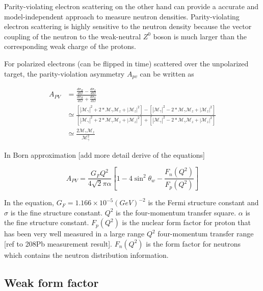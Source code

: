 Parity-violating electron scattering on the other hand can provide a accurate and model-independent approach to measure neutron densities. Parity-violating electron scattering is highly sensitive to the neutron density because the vector coupling of the neutron to the weak-neutral $Z^0$ boson is much larger than the corresponding weak charge of the protons. 

For polarized electrons (can be flipped in time) scattered over the unpolarized target, the parity-violation asymmetry $A_{pv}$ can be written as

\begin{equation}
\begin{split}
    A_{PV} &= \frac{\frac{d\sigma_R}{d\Omega} - \frac{d\sigma_L}{d\Omega}}{\frac{d\sigma_R}{d\Omega} + \frac{d\sigma_L}{d\Omega}} \\
    & \simeq \frac{[|\mathcal{M}_{\gamma}|^2 + 2*\mathcal{M}_{\gamma}\mathcal{M}_z + |\mathcal{M}_z|^2] - [|\mathcal{M}_{\gamma}|^2 - 2*\mathcal{M}_{\gamma}\mathcal{M}_z + |\mathcal{M}_z|^2]}{[|\mathcal{M}_{\gamma}|^2 + 2*\mathcal{M}_{\gamma}\mathcal{M}_z + |\mathcal{M}_z|^2] + [|\mathcal{M}_{\gamma}|^2 - 2*\mathcal{M}_{\gamma}\mathcal{M}_z + |\mathcal{M}_z|^2]} \\
    & \simeq \frac{2\mathcal{M}_{\gamma}\mathcal{M}_z}{\mathcal{M}_{\gamma}^2}
\end{split}
\end{equation}

In Born approximation [add more detail derive of the equations]

\begin{equation}
    A_{PV} = \frac{G_FQ^2}{4\sqrt{2}\pi\alpha}[1-4\sin^2{\theta_w} - \frac{F_n(Q^2)}{F_p(Q^2)}]
\end{equation}


In the equation, $G_F = 1.166 \times 10^{-5} (GeV)^{-2}$ is the Fermi structure constant and $\sigma$ is the fine structure constant. $Q^2$ is the four-momentum transfer square.  $\alpha$ is the fine structure constant. $F_p(Q^2)$ is the nuclear form factor for proton that has been very well measured in a large range $Q^2$ four-momentum transfer range [ref to 208Pb measurement result]. $F_n(Q^2)$ is the form factor for neutrons which contains the neutron distribution information. 



\subsection{Weak form factor}

